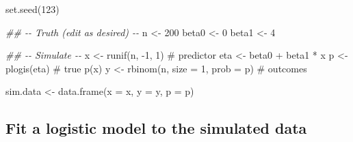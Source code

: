 \documentclass[
  letterpaper,
]{scrbook}
\newenvironment{Shaded}{\begin{snugshade}}{\end{snugshade}}
\newcommand{\AttributeTok}[1]{\textcolor[rgb]{0.40,0.45,0.13}{#1}}
\newcommand{\CommentTok}[1]{\textcolor[rgb]{0.37,0.37,0.37}{#1}}
\newcommand{\DecValTok}[1]{\textcolor[rgb]{0.68,0.00,0.00}{#1}}
\newcommand{\DocumentationTok}[1]{\textcolor[rgb]{0.37,0.37,0.37}{\textit{#1}}}
\newcommand{\FunctionTok}[1]{\textcolor[rgb]{0.28,0.35,0.67}{#1}}
\newcommand{\NormalTok}[1]{\textcolor[rgb]{0.00,0.23,0.31}{#1}}
\newcommand{\OtherTok}[1]{\textcolor[rgb]{0.00,0.23,0.31}{#1}}
\newcommand{\SpecialCharTok}[1]{\textcolor[rgb]{0.37,0.37,0.37}{#1}}
\begin{document}
\begin{Shaded}
\begin{Highlighting}[]
\FunctionTok{set.seed}\NormalTok{(}\DecValTok{123}\NormalTok{)}

\DocumentationTok{\#\# {-}{-} Truth (edit as desired) {-}{-}}
\NormalTok{n     }\OtherTok{\textless{}{-}} \DecValTok{200}
\NormalTok{beta0 }\OtherTok{\textless{}{-}} \DecValTok{0}
\NormalTok{beta1 }\OtherTok{\textless{}{-}}  \DecValTok{4}

\DocumentationTok{\#\# {-}{-} Simulate {-}{-}}
\NormalTok{x   }\OtherTok{\textless{}{-}} \FunctionTok{runif}\NormalTok{(n, }\SpecialCharTok{{-}}\DecValTok{1}\NormalTok{, }\DecValTok{1}\NormalTok{)             }\CommentTok{\# predictor}
\NormalTok{eta }\OtherTok{\textless{}{-}}\NormalTok{ beta0 }\SpecialCharTok{+}\NormalTok{ beta1 }\SpecialCharTok{*}\NormalTok{ x}
\NormalTok{p   }\OtherTok{\textless{}{-}} \FunctionTok{plogis}\NormalTok{(eta)                 }\CommentTok{\# true p(x)}
\NormalTok{y   }\OtherTok{\textless{}{-}} \FunctionTok{rbinom}\NormalTok{(n, }\AttributeTok{size =} \DecValTok{1}\NormalTok{, }\AttributeTok{prob =}\NormalTok{ p) }\CommentTok{\# outcomes}

\NormalTok{sim.data }\OtherTok{\textless{}{-}} \FunctionTok{data.frame}\NormalTok{(}\AttributeTok{x =}\NormalTok{ x, }\AttributeTok{y =}\NormalTok{ y, }\AttributeTok{p =}\NormalTok{ p)}
\end{Highlighting}
\end{Shaded}

\subsection{Fit a logistic model to the simulated
data}\label{fit-a-logistic-model-to-the-simulated-data}
\end{document}
